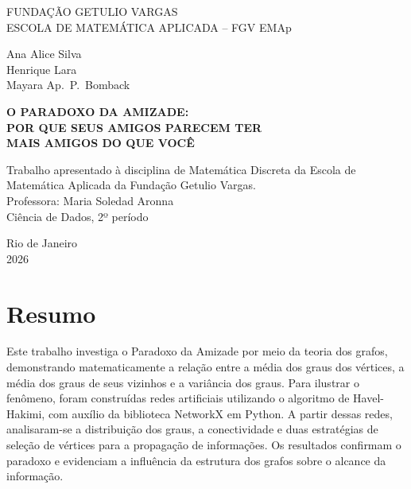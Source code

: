 \documentclass[12pt,a4paper]{article}
\theoremstyle{plain}
\theoremstyle{definition}
\theoremstyle{remark}
\begin{document}
\begin{titlepage}
\centering
\onehalfspacing
{\large FUNDAÇÃO GETULIO VARGAS\\
ESCOLA DE MATEMÁTICA APLICADA -- FGV EMAp\par}
\vspace{3cm}
{\large Ana Alice Silva\\ Henrique Lara\\ Mayara Ap.\ P.\ Bomback\par}
\vspace{3.5cm}
{\Large\bfseries O PARADOXO DA AMIZADE:\\[0.3em]
POR QUE SEUS AMIGOS PARECEM TER\\ MAIS AMIGOS DO QUE VOCÊ\par}
\vspace{3cm}
\begin{minipage}{0.7\textwidth}
\centering\small\singlespacing
Trabalho apresentado à disciplina de Matemática Discreta da Escola de
Matemática Aplicada da Fundação Getulio Vargas.\\[0.6em]
Professora: Maria Soledad Aronna\\
Ciência de Dados, 2º período
\end{minipage}
\vfill
{\large Rio de Janeiro\\ 2026\par}
\end{titlepage}


\section*{Resumo}

Este trabalho investiga o Paradoxo da Amizade por meio da
teoria dos grafos, demonstrando matematicamente a relação
entre a média dos graus dos vértices, a média dos graus
de seus vizinhos e a variância dos graus. Para ilustrar
o fenômeno, foram construídas redes artificiais utilizando
o algoritmo de Havel-Hakimi, com auxílio da biblioteca
NetworkX em Python. A partir dessas redes, analisaram-se
a distribuição dos graus, a conectividade e duas estratégias
de seleção de vértices para a propagação de informações.
Os resultados confirmam o paradoxo e evidenciam a influência
da estrutura dos grafos sobre o alcance da informação.
\end{document}
